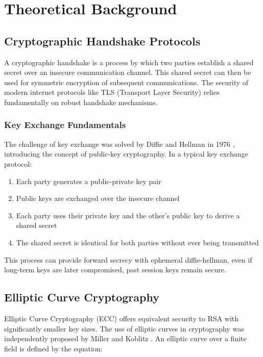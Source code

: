 \chapter{Theoretical Background}

\section{Cryptographic Handshake Protocols}

A cryptographic handshake is a process by which two parties establish a shared secret over an insecure communication channel. This shared secret can then be used for symmetric encryption of subsequent communications. The security of modern internet protocols like TLS (Transport Layer Security) relies fundamentally on robust handshake mechanisms.

\subsection{Key Exchange Fundamentals}

The challenge of key exchange was solved by Diffie and Hellman in 1976 \cite{Diffie1976}, introducing the concept of public-key cryptography. In a typical key exchange protocol:

\begin{enumerate}
\item Each party generates a public-private key pair
\item Public keys are exchanged over the insecure channel
\item Each party uses their private key and the other's public key to derive a shared secret
\item The shared secret is identical for both parties without ever being transmitted
\end{enumerate}

This process can provide forward secrecy \cite{Krawczyk2005} with ephemeral diffie-hellman, even if long-term keys are later compromised, past session keys remain secure.

\section{Elliptic Curve Cryptography}

Elliptic Curve Cryptography (ECC) offers equivalent security to RSA with significantly smaller key sizes. The use of elliptic curves in cryptography was independently proposed by Miller \cite{Miller1985} and Koblitz \cite{Koblitz1987}. An elliptic curve over a finite field is defined by the equation:

